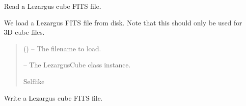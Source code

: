 \documentclass[letterpaper,11pt,english]{sphinxmanual}
\begin{document}
\begin{savenotes}
\begin{fulllineitems}
\begin{savenotes}
\begin{fulllineitems}
\begin{quote}
\begin{description}
\begin{itemize}
\end{itemize}

\end{description}\end{quote}

\end{fulllineitems}\end{savenotes}


\begin{savenotes}\begin{fulllineitems}
\label{\detokenize{code/lezargus.container.cube:lezargus.container.cube.LezargusCube.read_fits_file}}
\pysigstartsignatures
{}
\pysigstopsignatures
\sphinxAtStartPar
Read a Lezargus cube FITS file.

\sphinxAtStartPar
We load a Lezargus FITS file from disk. Note that this should only
be used for 3\sphinxhyphen{}D cube files.
\begin{quote}\begin{description}
\sphinxAtStartPar
{} () – The filename to load.

\sphinxAtStartPar
{} – The LezargusCube class instance.

\sphinxAtStartPar
Self\sphinxhyphen{}like

\end{description}\end{quote}

\end{fulllineitems}\end{savenotes}


\begin{savenotes}\begin{fulllineitems}
\label{\detokenize{code/lezargus.container.cube:lezargus.container.cube.LezargusCube.write_fits_file}}
\pysigstartsignatures
{}
\pysigstopsignatures
\sphinxAtStartPar
Write a Lezargus cube FITS file.


\end{fulllineitems}
\end{savenotes}
\end{fulllineitems}
\end{savenotes}
\end{document}
